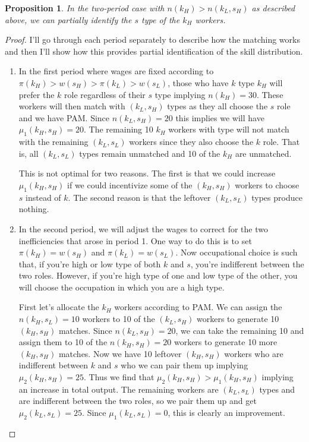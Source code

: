 \documentclass[12 pt]{article}
\newtheorem{proposition}{Proposition} %
\begin{document}
\begin{proposition}
	In the two-period case with $n(k_H) > n(k_L,s_H)$ as described above, we can partially identify the $s$ type of the $k_H$ workers.
	\label{prop:partialidentex}
\end{proposition}
\begin{proof}
	I'll go through each period separately to describe how the matching works and then I'll show how this provides partial identification of the skill distribution. 
	\begin{enumerate}
		\item In the first period where wages are fixed according to $\pi(k_H) > w(s_H) > \pi(k_L) > w(s_L)$, those who have $k$ type $k_H$ will prefer the $k$ role regardless of their $s$ type implying $n(k_H)=30$. These workers will then match with $(k_L,s_H)$ types as they all choose the $s$ role and we have PAM. Since $n(k_L,s_H)=20$ this implies we will have $\mu_1(k_H,s_H) = 20$. The remaining 10 $k_H$ workers with type will not match with the remaining $(k_L,s_L)$ workers since they also choose the $k$ role. That is, all $(k_L,s_L)$  types remain unmatched and 10 of the $k_H$ are unmatched. 
		
		This is not optimal for two reasons. The first is that we could increase $\mu_1(k_H,s_H)$ if we could incentivize some of the $(k_H,s_H)$ workers to choose $s$ instead of $k$. The second reason is that the leftover  $(k_L,s_L)$ types produce nothing.
		
		\item In the second period, we will adjust the wages to correct for the two inefficiencies that arose in period 1. One way to do this is to set $\pi(k_H)=w(s_H)$ and $\pi(k_L)=w(s_L)$. Now occupational choice is such that, if you're high or low type of both $k$ and $s$, you're indifferent between the two roles. However, if you're high type of one and low type of the other, you will choose the occupation in which you are a high type.
		
		 First let's allocate the $k_H$ workers according to PAM. We can assign the $n(k_H,s_L)=10$ workers to 10 of the $(k_L,s_H)$ workers to generate 10 $(k_H,s_H)$ matches. Since $n(k_L,s_H)=20$, we can take the remaining 10 and assign them to 10 of the $n(k_H,s_H)=20$ workers to generate 10 more $(k_H,s_H)$ matches. Now we have 10 leftover $(k_H,s_H)$ workers who are indifferent between $k$ and $s$ who we can pair them up implying $\mu_2(k_H,s_H) = 25$. Thus we find that  $\mu_2(k_H,s_H) > \mu_1(k_H,s_H)$ implying an increase in total output. The remaining workers are $(k_L,s_L)$ types and are indifferent between the two roles, so we pair them up and get $\mu_2(k_L,s_L)=25$.  Since $\mu_1(k_L,s_L)=0$, this is clearly an improvement.
		 

\end{enumerate}
\end{proof}
\end{document}

